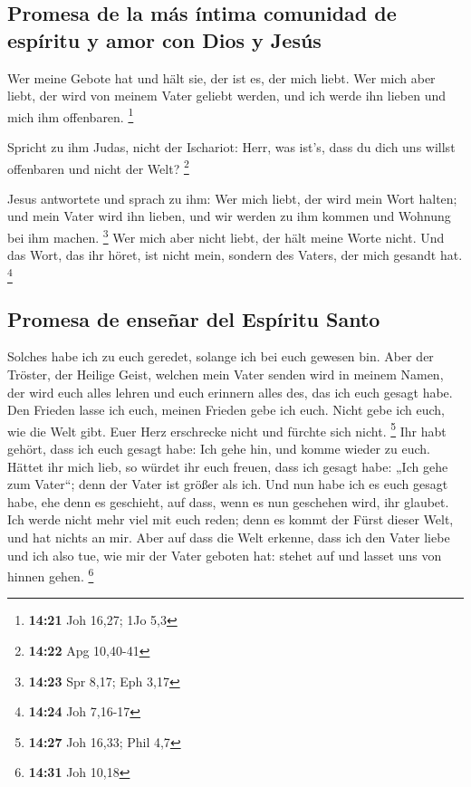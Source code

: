 \hypertarget{promesa-de-la-muxe1s-uxedntima-comunidad-de-espuxedritu-y-amor-con-dios-y-jesuxfas}{%
\subsection{Promesa de la más íntima comunidad de espíritu y amor con
Dios y
Jesús}\label{promesa-de-la-muxe1s-uxedntima-comunidad-de-espuxedritu-y-amor-con-dios-y-jesuxfas}}

 Wer meine Gebote hat und hält sie, der ist es, der mich
liebt. Wer mich aber liebt, der wird von meinem Vater geliebt werden,
und ich werde ihn lieben und mich ihm offenbaren. \footnote{\textbf{14:21}
  Joh 16,27; 1Jo 5,3}

 Spricht zu ihm Judas, nicht der Ischariot: Herr, was
ist's, dass du dich uns willst offenbaren und nicht der Welt?
\footnote{\textbf{14:22} Apg 10,40-41}

 Jesus antwortete und sprach zu ihm: Wer mich liebt, der
wird mein Wort halten; und mein Vater wird ihn lieben, und wir werden zu
ihm kommen und Wohnung bei ihm machen. \footnote{\textbf{14:23} Spr
  8,17; Eph 3,17}  Wer mich aber nicht liebt, der hält
meine Worte nicht. Und das Wort, das ihr höret, ist nicht mein, sondern
des Vaters, der mich gesandt hat. \footnote{\textbf{14:24} Joh 7,16-17}

\hypertarget{promesa-de-enseuxf1ar-del-espuxedritu-santo}{%
\subsection{Promesa de enseñar del Espíritu
Santo}\label{promesa-de-enseuxf1ar-del-espuxedritu-santo}}

 Solches habe ich zu euch geredet, solange ich bei euch
gewesen bin.  Aber der Tröster, der Heilige Geist,
welchen mein Vater senden wird in meinem Namen, der wird euch alles
lehren und euch erinnern alles des, das ich euch gesagt habe.
 Den Frieden lasse ich euch, meinen Frieden gebe ich
euch. Nicht gebe ich euch, wie die Welt gibt. Euer Herz erschrecke nicht
und fürchte sich nicht. \footnote{\textbf{14:27} Joh 16,33; Phil 4,7}
 Ihr habt gehört, dass ich euch gesagt habe: Ich gehe
hin, und komme wieder zu euch. Hättet ihr mich lieb, so würdet ihr euch
freuen, dass ich gesagt habe: „Ich gehe zum Vater``; denn der Vater ist
größer als ich.  Und nun habe ich es euch gesagt habe,
ehe denn es geschieht, auf dass, wenn es nun geschehen wird, ihr
glaubet.  Ich werde nicht mehr viel mit euch reden; denn
es kommt der Fürst dieser Welt, und hat nichts an mir. 
Aber auf dass die Welt erkenne, dass ich den Vater liebe und ich also
tue, wie mir der Vater geboten hat: stehet auf und lasset uns von hinnen
gehen. \footnote{\textbf{14:31} Joh 10,18}


